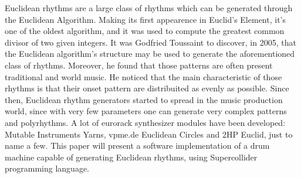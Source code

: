 \documentclass[main.tex]{subfiles}
\begin{document}
Euclidean rhythms are a large class of rhythms which can be generated through the Euclidean Algorithm. Making its first appearence in Euclid’s Element, it’s one of the oldest algorithm, and it was used to compute the greatest common divisor of two given integers. 
It was Godfried Toussaint to discover, in 2005, that the Euclidean algorithm’s structure may be used to generate the aforementioned class of rhythms. Moreover, he found that those patterns are often present traditional and world music\cite{Toussaint:2004:euclidean:rhythm}. He noticed that the main characteristic of those rhythms is that their onset pattern are distribuited as evenly as possible.
Since then, Euclidean rhythm generators started to spread in the music production world, since with very few parameters one can generate very complex patterns and polyrhythms. A lot of eurorack synthesizer modules have been developed: Mutable Instruments Yarns\cite{MutableInstruments:Yarns}, vpme.de Euclidean Circles\cite{vpme.de} and 2HP Euclid\cite{2hp:Euclid}, just to name a few. 
This paper will present a software implementation of a drum machine capable of generating Euclidean rhythms, using Supercollider programming language.
\end{document}
